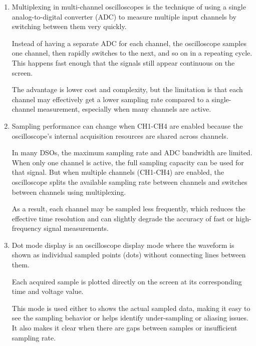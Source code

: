 \documentclass[../main.tex]{subfiles}
\begin{document}
\begin{enumerate}[label=\textbf{\arabic*.}]
	In many DSOs, when more channels are active, the oscilloscope may: split the maximum sampling rate across channels (so each channel gets a lower effective sampling rate), or use time-interleaving or multiplexing, where channels are sampled sequentially instead of simultaneously.
		
	\item Multiplexing in multi-channel oscilloscopes is the technique of using a single analog-to-digital converter (ADC) to measure multiple input channels by switching between them very quickly.

	Instead of having a separate ADC for each channel, the oscilloscope samples one channel, then rapidly switches to the next, and so on in a repeating cycle. This happens fast enough that the signals still appear continuous on the screen.

	The advantage is lower cost and complexity, but the limitation is that each channel may effectively get a lower sampling rate compared to a single-channel measurement, especially when many channels are active.

	
	\item Sampling performance can change when CH1-CH4 are enabled because the oscilloscope’s internal acquisition resources are shared across channels.

	In many DSOs, the maximum sampling rate and ADC bandwidth are limited. When only one channel is active, the full sampling capacity can be used for that signal. But when multiple channels (CH1-CH4) are enabled, the oscilloscope splits the available sampling rate between channels and switches between channels using multiplexing.

	As a result, each channel may be sampled less frequently, which reduces the effective time resolution and can slightly degrade the accuracy of fast or high-frequency signal measurements.

	
	
	\item Dot mode display is an oscilloscope display mode where the waveform is shown as individual sampled points (dots) without connecting lines between them.

	Each acquired sample is plotted directly on the screen at its corresponding time and voltage value.

	This mode is used either to shows the actual sampled data, making it easy to see the sampling behavior or helps identify under-sampling or aliasing issues. It also makes it clear when there are gaps between samples or insufficient sampling rate.


\end{enumerate}
\end{document}
